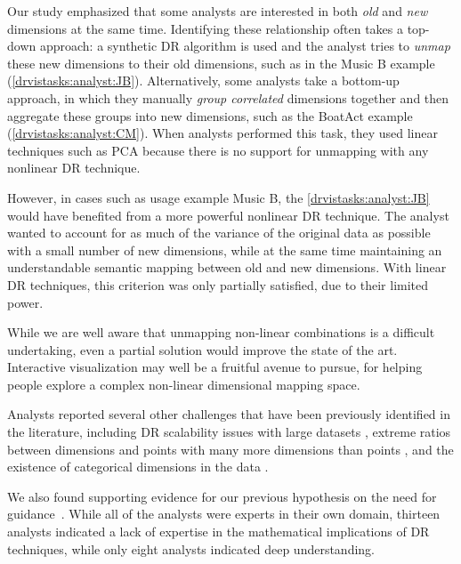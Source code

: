 Our study emphasized that some analysts are interested in both {\it old} and {\it new} dimensions at the same time.
Identifying these relationship often takes a top-down approach: a synthetic \ac{DR} algorithm is used and the analyst tries to {\it unmap} these new dimensions to their old dimensions, such as in the {\sc Music B} example (\ref{drvistasks:analyst:JB}). 
Alternatively, some analysts take a bottom-up approach, in which they manually {\it group correlated} dimensions together and then aggregate these groups into new dimensions, such as the {\sc BoatAct} example (\ref{drvistasks:analyst:CM}). 
When analysts performed this task, they used linear techniques such as \ac{PCA} because there is no support for unmapping with any nonlinear \ac{DR} technique. 

However, in cases such as usage example {\sc Music B}, the \ref{drvistasks:analyst:JB} would have benefited from a more powerful nonlinear \ac{DR} technique. 
The analyst wanted to account for as much of the variance of the original data as possible with a small number of new dimensions, while at the same time maintaining an understandable semantic mapping between old and new dimensions. 
With linear \ac{DR} techniques, this criterion was only partially satisfied, due to their limited power.

While we are well aware that unmapping non-linear combinations is a difficult undertaking, even a partial solution would improve the state of the art. 
Interactive visualization may well be a fruitful avenue to pursue, for helping people explore a complex non-linear dimensional mapping space.

Analysts reported several other challenges that have been previously identified in the literature, including \ac{DR} scalability issues with large datasets \cite{Brandes2007,Ingram2009}, extreme ratios between dimensions and points with many more dimensions than points \cite{Cunningham2008,West2003}, and the existence of categorical dimensions in the data \cite{Friendly2000,Greenacre2006}.  

We also found supporting evidence for our previous hypothesis on the need for guidance~\cite{Ingram2010}. 
While all of the analysts were experts in their own domain, thirteen analysts indicated a lack of expertise in the mathematical implications of \ac{DR} techniques, while only eight analysts indicated deep understanding.

